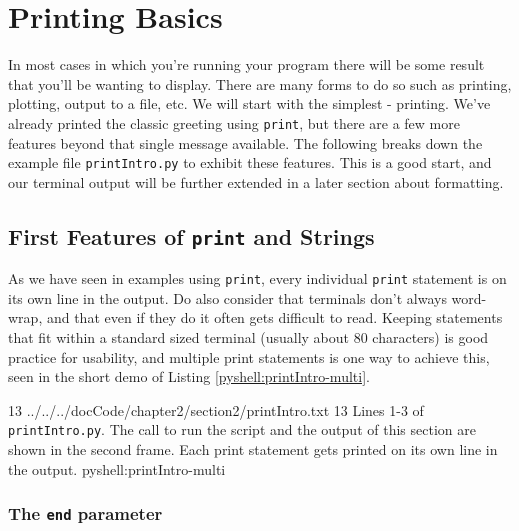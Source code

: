 \documentclass[oneside]{book}
\begin{document}
\FloatBarrier

\section{Printing Basics}\label{sec:printBasics}

In most cases in which you're running your program there will be some result that you'll be wanting to display. There are many forms to do so such as printing, plotting, output to a file, etc. We will start with the simplest - printing. We've already printed the classic greeting using \texttt{print}, but there are a few more features beyond that single message available. The following breaks down the example file \texttt{printIntro.py} to exhibit these features. This is a good start, and our terminal output will be further extended in a later section about formatting.

\FloatBarrier

\subsection{First Features of \texttt{print} and Strings}\label{sec:printFeatures}

As we have seen in examples using \texttt{print}, every individual \texttt{print} statement is on its own line in the output. Do also consider that terminals don't always word-wrap, and that even if they do it often gets difficult to read. Keeping statements that fit within a standard sized terminal (usually about 80 characters) is good practice for usability, and multiple print statements is one way to achieve this, seen in the short demo of Listing \ref{pyshell:printIntro-multi}.

{1}{3}
{../../../docCode/chapter2/section2/printIntro.txt}
{1}{3}
{Lines 1-3 of \texttt{printIntro.py}. The call to run the script and the output of this section are shown in the second frame. Each print statement gets printed on its own line in the output.}
{pyshell:printIntro-multi}

\subsubsection{The \texttt{end} parameter}\label{sec:printEnd}
\end{document}
